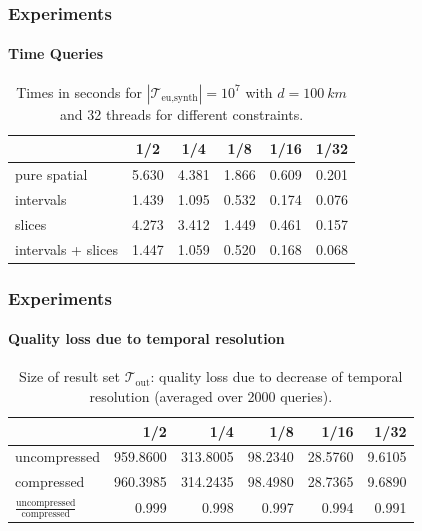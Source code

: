 \documentclass{beamer}
\newcommand{\traj}[2]{\mathcal{T}_{\text{#1},\text{#2}}}
\begin{document}
\begin{frame}
	\frametitle{Experiments}
	\framesubtitle{Time Queries}
	\begin{table}
		{
			\caption[Messungen$europe\_10\_24_time_variants_nekton$]{Times in seconds for $|\traj{eu}{synth}|=10^7$ with $d=\SI{100}{km}$ and 32 threads for different constraints.}
			\begin{tabular}{|l||c|c|c|c|c|}
				\hline
				                   & 1/2   & 1/4   & 1/8   & 1/16  & 1/32
				\\ \hline
				pure spatial       & 5.630 & 4.381 & 1.866 & 0.609 & 0.201 \\
				intervals          & 1.439 & 1.095 & 0.532 & 0.174 & 0.076 \\
				slices             & 4.273 & 3.412 & 1.449 & 0.461 & 0.157 \\
				intervals + slices & 1.447 & 1.059 & 0.520 & 0.168 & 0.068 \\
				\hline
			\end{tabular}
		}
	\end{table}
\end{frame}

\begin{frame}
	\frametitle{Experiments}
	\framesubtitle{Quality loss due to temporal resolution}
	\begin{table}
		{
		\caption{Size of result set $\mathcal{T}_{\text{out}}$: quality loss due to decrease of temporal resolution (averaged over 2000 queries).}\label{tab:temporalQualityLoss}
		\begin{tabular}{|l||r|r|r|r|r|}
			\hline
			                                                & 1/2      & 1/4      & 1/8     & 1/16    & 1/32   \\
			\hline
			uncompressed                                    & 959.8600 & 313.8005 & 98.2340 & 28.5760 & 9.6105 \\
			compressed                                      & 960.3985 & 314.2435 & 98.4980 & 28.7365 & 9.6890 \\
			$\frac{\text{uncompressed}}{\text{compressed}}$ & 0.999    & 0.998    & 0.997   & 0.994   & 0.991  \\
			\hline
		\end{tabular}
		}
	\end{table}
\end{frame}
\end{document}
